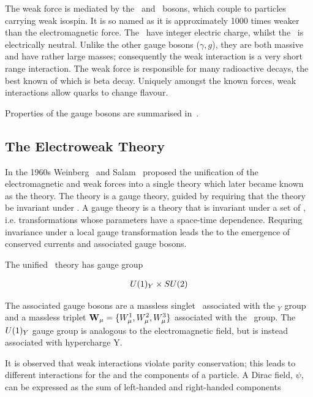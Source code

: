 The weak force is mediated by the \Wpm\ and \Z\ bosons, which couple to particles
carrying weak isospin. It is so named as it is approximately 1000 times weaker
than the electromagnetic force. The \Wpm\ have integer electric
charge, whilst the \Z\ is electrically neutral. Unlike the other gauge bosons
($\gamma,g$), they are both massive and have rather large masses; consequently the weak
interaction is a very short range interaction. The weak force is responsible for
many radioactive decays, the best known of which is beta decay. Uniquely amongst
the known forces, weak interactions allow quarks to change flavour.

Properties of the gauge bosons are summarised in~.

\subsection{The Electroweak Theory}

In the 1960s Weinberg~\cite{PhysRevLett.19.1264} and Salam~\cite{Salam1964168} proposed the unification of the electromagnetic
and weak forces into a single theory which later became known as the
 theory. The theory is a gauge theory, guided by requiring that the theory be
invariant under . A gauge theory is a theory
that is invariant under a set of , i.e.
transformations whose parameters have a space-time dependence. Requring
invariance under a local gauge transformation leads the to the emergence of
conserved currents and associated gauge bosons.

The unified \ew\ theory has gauge group

\begin{align}
U(1)_{Y} \times SU(2) 
\end{align}

The associated gauge bosons are a massless singlet \Bmu\ associated with the
\uone$_Y$ group and a massless triplet
$\mathbf{W_{\mu}} = \{W^{1}_{\mu}, W^{2}_{\mu}, W^{3}_{\mu}\}$ associated with the \sutwo\ group. The $U(1)_{Y}$ gauge group is analogous to the
electromagnetic field, but is instead associated with hypercharge Y.

It is observed that weak interactions violate parity conservation; this leads to
different interactions for the  and the 
components of a particle. A Dirac field, $\psi$, can be expressed as the sum of 
left-handed and right-handed components

